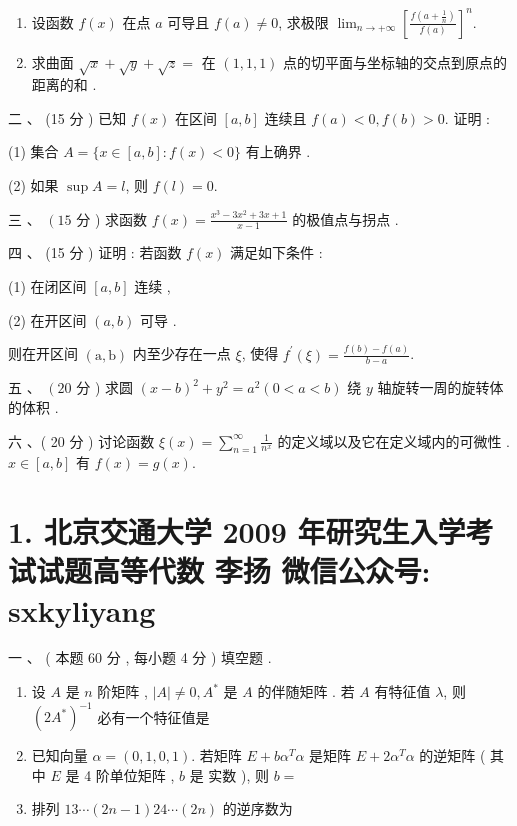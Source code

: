 \documentclass[10pt]{article}
\begin{document}
{\begin{enumerate}
  \item  设函数  $f(x)$  在点  $a$  可导且  $f(a) \neq 0$,  求极限  $\lim _{n \rightarrow+\infty}\left[\frac{f\left(a+\frac{1}{n}\right)}{f(a)}\right]^{n}$.

  \item  求曲面  $\sqrt{x}+\sqrt{y}+\sqrt{z}=$  在  $(1,1,1)$  点的切平面与坐标轴的交点到原点的距离的和 .

\end{enumerate}
 二 、 (15  分 )  已知  $f(x)$  在区间  $[a, b]$  连续且  $f(a)<0, f(b)>0$.  证明 :

(1)  集合  $A=\{x \in[a, b]: f(x)<0\}$  有上确界 .

(2)  如果  $\sup A=l$,  则  $f(l)=0$.

 三 、 $\left(15\right.$  分 )  求函数  $f(x)=\frac{x^{3}-3 x^{2}+3 x+1}{x-1}$  的极值点与拐点 .

 四 、 (15  分 )  证明 :  若函数  $f(x)$  满足如下条件 :

(1)  在闭区间  $[a, b]$  连续 ,

(2)  在开区间  $(a, b)$  可导 .

 则在开区间  $(\mathrm{a}, \mathrm{b})$  内至少存在一点  $\xi$,  使得  $f^{\prime}(\xi)=\frac{f(b)-f(a)}{b-a}$.

 五 、 $\left(20\right.$  分 )  求圆  $(x-b)^{2}+y^{2}=a^{2}(0<a<b)$  绕  $y$  轴旋转一周的旋转体的体积 .

 六 、( 20  分 )  讨论函数  $\xi(x)=\sum_{n=1}^{\infty} \frac{1}{n^{x}}$  的定义域以及它在定义域内的可微性 . $x \in[a, b]$  有  $f(x)=g(x)$.

\section{1. 北京交通大学 2009 年研究生入学考试试题高等代数 
 李扬 
 微信公众号: sxkyliyang}
 一 、 ( 本题  60  分 ,  每小题  4  分 )  填空题 .

\begin{enumerate}
  \item  设  $A$  是  $n$  阶矩阵 , $|A| \neq 0, A^{*}$  是  $A$  的伴随矩阵 .  若  $A$  有特征值  $\lambda$,  则  $\left(2 A^{*}\right)^{-1}$  必有一个特征值是 

  \item  已知向量  $\alpha=(0,1,0,1)$.  若矩阵  $E+b \alpha^{T} \alpha$  是矩阵  $E+2 \alpha^{T} \alpha$  的逆矩阵  ( 其中  $E$  是  4  阶单位矩阵 , $b$  是   实数 ),  则  $b=$

  \item  排列  $13 \cdots(2 n-1) 24 \cdots(2 n)$  的逆序数为 


\end{enumerate}}
\end{document}
